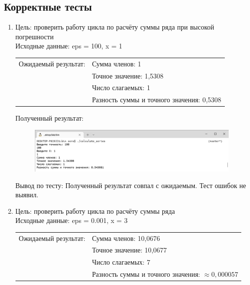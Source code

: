 \documentclass[a4paper]{article}
\begin{document}
	\subsection{Корректные тесты}
	\renewcommand{\arraystretch}{1.5}
	\begin{enumerate}[label=\textbf{Тест \arabic*},start=3]
		\item Цель: проверить работу цикла по расчёту суммы ряда при высокой погрешности \\
		Исходные данные: eps = 100, x = 1 \\
		
		\begin{tabular}{l l}
			Ожидаемый результат: & Сумма членов: 1                           \\
			                     & Точное значение: 1,5308                   \\
			                     & Число слагаемых: 1                        \\
			                     & Разность суммы и точного значения: 0,5308 \\[4mm]
		\end{tabular}
	
		Полученный результат:
		
		\begin{figure}[h]
			\includegraphics[width=\textwidth,trim=0.5mm 0 0 0.5mm,clip]{tests/test100.png}
		\end{figure}
		
		Вывод по тесту: Полученный результат совпал с ожидаемым. Тест ошибок не выявил.
		\newpage
		
		\item Цель: проверить работу цикла по расчёту суммы ряда \\
		Исходные данные: eps = 0.001, x = 3 \\
		
		\begin{tabular}{l l}
			Ожидаемый результат: & Сумма членов: 10,0676                                \\
			                     & Точное значение: 10,0677                             \\
			                     & Число слагаемых: 7                                   \\
			                     & Разность суммы и точного значения: $\approx 0,000057$ \\[4mm]
		\end{tabular}
		

\end{enumerate}
\end{document}
